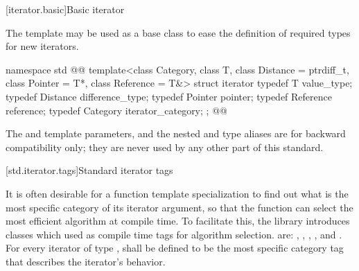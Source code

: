 [iterator.basic]{Basic iterator}

\pnum
The
template may be used as a base class to ease the definition of required types
for new iterators.

%
\begin{codeblock}
namespace std { @@
  template<class Category, class T, class Distance = ptrdiff_t,
    class Pointer = T*, class Reference = T&>
  struct iterator {
    typedef T         value_type;
    typedef Distance  difference_type;
    typedef Pointer   pointer;
    typedef Reference reference;
    typedef Category  iterator_category;
  };
}@\added{\}\}}\newtxt{\}}@
\end{codeblock}

\begin{addedblock}
\pnum
\enternote The  and  template parameters, and the nested 
and  type aliases are for backward compatibility only; they are never used by any
other part of this standard.\exitnote
\end{addedblock}

[std.iterator.tags]{Standard iterator tags}

\pnum
{}%
%
%
%
%
%
It is often desirable for a
function template specialization
to find out what is the most specific category of its iterator
argument, so that the function can select the most efficient algorithm at compile time.
To facilitate this, the
library introduces
classes which  used as compile time tags for algorithm selection.
 are:
,
,
,
,
and
.
For every iterator of type
,
shall be defined to be the most specific category tag that describes the
iterator's behavior.

